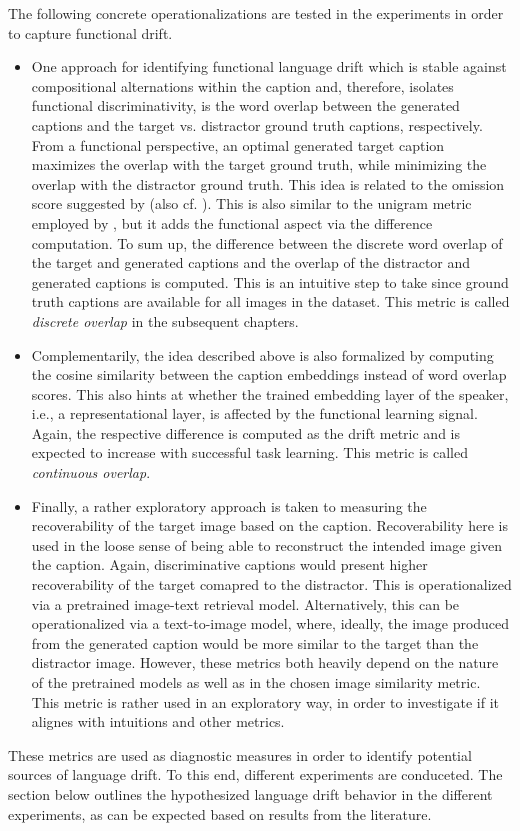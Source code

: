 The following concrete operationalizations are tested in the experiments in order to capture functional drift. \begin{itemize}
	\item One approach for identifying functional language drift which is stable against compositional alternations within the caption and, therefore, isolates functional discriminativity, is the word overlap between the generated captions and the target vs. distractor ground truth captions, respectively. From a functional perspective, an optimal generated target caption maximizes the overlap with the target ground truth, while minimizing the overlap with the distractor ground truth. This idea is related to the omission score suggested by \cite{havrylov2017emergence} (also cf. \cite{andreas2016reasoning, gunel2020supervised}). This is also similar to the unigram metric employed by \cite{lazaridou2020multi}, but it adds the functional aspect via the difference computation. To sum up, the difference between the discrete word overlap of the target and generated captions and the overlap of the distractor and generated captions is computed. This is an intuitive step to take since ground truth captions are available for all images in the dataset. This metric is called \textit{discrete overlap} in the subsequent chapters.
	\item Complementarily, the idea described above is also formalized by computing the cosine similarity between the caption embeddings instead of word overlap scores. This also hints at whether the trained embedding layer of the speaker, i.e., a representational layer, is affected by the functional learning signal. Again, the respective difference is computed as the drift metric and is expected to increase with successful task learning. This metric is called \textit{continuous overlap}.
	\item {} Finally, a rather exploratory approach is taken to measuring the recoverability of the target image based on the caption. Recoverability here is used in the loose sense of being able to reconstruct the intended image given the caption. Again, discriminative captions would present higher recoverability of the target comapred to the distractor.  This is operationalized via a pretrained image-text retrieval model. Alternatively, this can be operationalized via a text-to-image model, where, ideally, the image produced from the generated caption would be more similar to the target than the distractor image. However, these metrics both heavily depend on the nature of the pretrained models as well as in the chosen image similarity metric. This metric is rather used in an exploratory way, in order to investigate if it alignes with intuitions and other metrics.
\end{itemize}
These metrics are used as diagnostic measures in order to identify potential sources of language drift. To this end, different experiments are conduceted. The section below outlines the hypothesized language drift behavior in the different experiments, as can be expected based on results from the literature.

